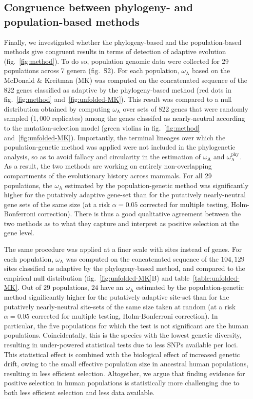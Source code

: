 \documentclass[9pt,twocolumn,twoside,lineno]{pnas-new}
\newcommand{\rateApop}{\omega_{\mathrm{A}}}
\newcommand{\rateAphy}{\rateApop^{\mathrm{phy}}}
\begin{document}
\subsection*{Congruence between phylogeny- and population-based methods}
Finally, we investigated whether the phylogeny-based and the population-based methods give congruent results in terms of detection of adaptive evolution (fig.~\ref{fig:method}).
To do so, population genomic data were collected for 29 populations across 7 genera (fig.~S2).
For each population, $\rateApop$ based on the McDonald \& Kreitman (MK)\cite{mcdonald_adaptative_1991} was computed on the concatenated sequence of the 822 genes classified as adaptive by the phylogeny-based method (red dots in fig.~\ref{fig:method} and~\ref{fig:unfolded-MK}).
This result was compared to a null distribution obtained by computing $\rateApop$ over sets of 822 genes that were randomly sampled ($1,000$ replicates) among the genes classifed as nearly-neutral according to the mutation-selection model (green violins in fig.~\ref{fig:method} and~\ref{fig:unfolded-MK}).
Importantly, the terminal lineages over which the population-genetic method was applied were not included in the phylogenetic analysis, so as to avoid fallacy and circularity in the estimation of $\rateApop$ and $\rateAphy$.
As a result, the two methods are working on entirely non-overlapping compartments of the evolutionary history across mammals.
For all 29 populations, the $\rateApop$ estimated by the population-genetic method was significantly higher for the putatively adaptive gene-set than for the putatively nearly-neutral gene sets of the same size (at a risk $\alpha=0.05$ corrected for multiple testing, Holm-Bonferroni correction).
There is thus a good qualitative agreement between the two methods as to what they capture and interpret as positive selection at the gene level.

The same procedure was applied at a finer scale with sites instead of genes.
For each population, $\rateApop$ was computed on the concatenated sequence of the $104,129$ sites classified as adaptive by the phylogeny-based method, and compared to the empirical null distribution (fig.~\ref{fig:unfolded-MK}B) and table~\ref{table:unfolded-MK}.
Out of $29$ populations, $24$ have an $\rateApop$ estimated by the population-genetic method significantly higher for the putatively adaptive site-set than for the putatively nearly-neutral site-sets of the same size taken at random (at a risk $\alpha=0.05$ corrected for multiple testing, Holm-Bonferroni correction).
In particular, the five populations for which the test is not significant are the human populations.
Coincidentally, this is the species with the lowest genetic diversity, resulting in under-powered statistical tests due to less SNPs available per loci.
This statistical effect is combined with the biological effect of increased genetic drift, owing to the small effective population size in ancestral human populations, resulting in less efficient selection.
Altogether, we argue that finding evidence for positive selection in human populations is statistically more challenging due to both less efficient selection and less data available.
\end{document}
